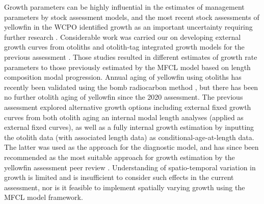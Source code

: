 Growth parameters can be highly influential in the estimates of management parameters by stock assessment models, and the most recent stock assessments of yellowfin in the WCPO identified growth as an important uncertainty requiring further research \citep{mckechnie_stock_2017,vincent_incorporation_2018, vincent_stock_2020}. Considerable work was carried our on developing external growth curves from otoliths and otolith-tag integrated growth models for the previous assessment \citep{eveson_integrated_2020,farley_age_2020}. Those studies resulted in different estimates of growth rate parameters to those previously estimated by the MFCL model based on length composition modal progression. Annual aging of yellowfin using otoliths has recently been validated using the bomb radiocarbon method \citep{andrews_final_2022}, but there has been no further otolith aging of yellowfin since the 2020 assessment. The previous assessment explored alternative growth options including external fixed growth curves from both otolith aging an internal modal length analyses (applied as external fixed curves), as well as a fully internal growth estimation by inputting the otolith data (with associated length data) as conditional-age-at-length data. The latter was used as the approach for the diagnostic model, and has since been recommended as the most suitable approach for growth estimation by the yellowfin assessment peer review \citep{punt_independent_2023}. Understanding of spatio-temporal variation in growth is limited and is insufficient to consider such effects in the current assessment, nor is it feasible to implement spatially varying growth using the MFCL model framework.

